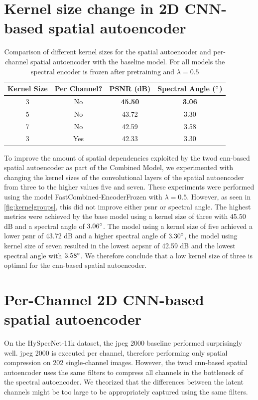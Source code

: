 \section{Kernel size change in 2D CNN-based spatial autoencoder}
\begin{table}
\centering
\begin{tabular}{|c|c|c|c|}
\hline
Kernel Size & Per Channel? & PSNR (dB) & Spectral Angle ($\degree$) \\
\hline\hline
3 & No & \textbf{45.50} & \textbf{3.06} \\
\hline
5 & No & 43.72 & 3.30 \\
\hline
7 & No & 42.59 & 3.58 \\
\hline
3 & Yes & 42.33 & 3.30 \\
\hline
\end{tabular}
\caption{Comparison of different kernel sizes for the spatial autoencoder and per-channel spatial autoencoder with the baseline model. For all models the spectral encoder is frozen after pretraining and $\lambda = 0.5$}
\label{fig:kernelgroups}
\end{table}

To improve the amount of spatial dependencies exploited by the \ac{twod} \ac{cnn}-based spatial autoencoder as part of the Combined Model, we experimented with changing the kernel sizes of the convolutional layers of the spatial autoencoder from three to the higher values five and seven. These experiments were performed using the model FastCombined-EncoderFrozen with $\lambda=0.5$. However, as seen in \autoref{fig:kernelgroups}, this did not improve either \ac{psnr} or spectral angle. The highest metrics were achieved by the base model using a kernel size of three with 45.50 dB and a spectral angle of $3.06 \degree$. The model using a kernel size of five achieved a lower \ac{psnr} of 43.72 dB and a higher spectral angle of $3.30 \degree$, the model using kernel size of seven resulted in the lowest ac{psnr} of 42.59 dB and the lowest spectral angle with $3.58 \degree$. We therefore conclude that a low kernel size of three is optimal for the \ac{cnn}-based spatial autoencoder.

\section{Per-Channel 2D CNN-based spatial autoencoder}
On the HySpecNet-11k dataset, the \ac{jpeg} 2000 baseline performed surprisingly well. \Ac{jpeg} 2000 is executed per channel, therefore performing only spatial compression on 202 single-channel images. However, the \ac{twod} \ac{cnn}-based spatial autoencoder uses the same filters to compress all channels in the bottleneck of the spectral autoencoder. We theorized that the differences between the latent channels might be too large to be appropriately captured using the same filters. 

